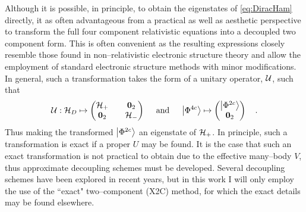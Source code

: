 Although it is possible, in principle, to obtain the eigenstates of
\cref{eq:DiracHam} directly, it as often advantageous from a practical as well
as aesthetic perspective to transform the full four component relativistic
equations into a decoupled two component form. This is often convenient as the
resulting expressions closely resemble those found in non--relativistic
electronic structure theory and allow the employment of standard electronic
structure methods with minor modifications.
\cite{Liu04_6658,Liu05_241102,Liu03_597,Liu05_054102,Liu12_154114} 
In general, such a transformation takes the form of a unitary operator,
$\mathcal{U}$, such that
\begin{equation}
\mathcal{U}: 
\mathcal{H}_D \mapsto \begin{pmatrix}
\mathcal{H}_+ && \boldsymbol{0}_2 \\ \boldsymbol{0}_2 && \mathcal{H}_- 
\end{pmatrix} \quad \text{ and } \quad
\left\vert \Phi^{4c} \right\rangle \mapsto \begin{pmatrix}
 \left\vert \Phi^{2c} \right\rangle \\ \boldsymbol{0}_2
\end{pmatrix} \quad.
\end{equation}
Thus making the transformed $\left\vert \Phi^{2c} \right\rangle$ an eigenstate of $\mathcal{H}_+$.  In
principle, such a transformation is exact if a proper $U$ may be found. It is
the case that such an exact transformation is not practical to obtain due to the
effective many--body $V$, thus approximate decoupling schemes must be developed.
Several decoupling schemes have been explored in recent years, but in this work
I will only employ the use of the ``exact" two--component (X2C) method, for
which the exact details may be found elsewhere.
\cite{Liu05_241102,Peng06_044102,Saue07_064102,Peng09_031104,Reiher13_184105,
Cheng07_104106,Liu16_204,Liu10_1679,Saue11_3077,Liu14_59,Liu16_204}

